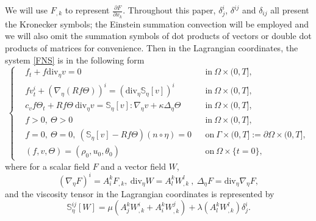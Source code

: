 \documentclass[12pt,a4paper]{amsart}
\numberwithin{equation}{section}
\theoremstyle{plain}
\theoremstyle{definition}
\newcommand{\dv}{\mathrm{div}}
\begin{document}
We will use $F_{,k}$ to represent $\frac{\partial F}{\partial x_k}$.
Throughout this paper, $\delta^i_j$, $\delta^{ij}$ and $\delta_{ij}$ all present the Kronecker symbols;
the Einstein summation convection will be employed and we will also omit the summation symbols of dot products of vectors or double dot products of matrices for convenience.
Then in the Lagrangian coordinates, the system \eqref{FNS} is in the following form
\begin{equation}
\label{0}
\left\{
\begin{aligned}
& f_t+f \dv_{\eta} v=0 && \text{in}\ \Omega\times(0,T],\\
& fv^i_t+(\nabla_{\eta} (Rf\Theta))^i = (\dv_{\eta} \mathbb{S}_{\eta}[v])^i && \text{in}\ \Omega\times(0,T],\\
& c_v f\Theta_t +Rf\Theta \ \dv_{\eta} v= \mathbb{S}_{\eta}[v]:\nabla_{\eta}v+\kappa \Delta_{\eta}\Theta && \text{in}\ \Omega\times(0,T],\\
&f>0,~ \Theta>0 && \text{in}\ \Omega\times(0,T],\\
&f=0,\ \Theta=0,\ (\mathbb{S}_{\eta}[v]-Rf\Theta) (n\circ \eta)=0 && \text{on} \ \Gamma\times(0,T]:=\partial\Omega\times (0,T],\\
&(f,v,\Theta)=(\rho_0,u_0,\theta_0) && \text{on}\ \Omega\times\{t=0\},
\end{aligned}
\right.
\end{equation}
where
for a scalar field $F$ and a vector field $W$,
$$
(\nabla_{\eta}F)^i=A_i^k F_{,k},~
\dv_{\eta} W=A_l^k W^l_{,k}\ ,~
\Delta_{\eta}F=\dv_{\eta}\nabla_{\eta} F,
$$
and the viscosity tensor in the Lagrangian coordinates is represented by
\begin{equation}\label{S}
\mathbb{S}^{ij}_{\eta}[W]=\mu (A^{k}_j W^i_{,k}+A^k_i W^j_{,k})+\lambda (A_l^k W^l_{,k} )\delta^i_j.
\end{equation}
\end{document}
